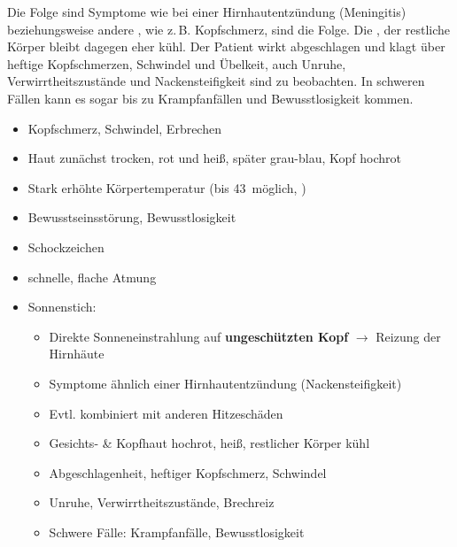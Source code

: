 {Die Folge sind Symptome wie bei
einer Hirnhautentzündung (Meningitis) beziehungsweise andere
, wie z.\,B. Kopfschmerz, sind die
Folge. Die , der 
restliche Körper bleibt dagegen eher kühl. Der Patient
wirkt abgeschlagen und klagt über heftige 
Kopfschmerzen, Schwindel und Übelkeit, auch Unruhe, 
Verwirrtheitszustände und Nackensteifigkeit sind zu
beobachten. In schweren Fällen kann es sogar bis zu 
Krampfanfällen und Bewusstlosigkeit kommen.
}{
\begin{itemize}
  \item Kopfschmerz, Schwindel, Erbrechen
  \item Haut zunächst trocken, rot und heiß, später grau-blau, Kopf
  hochrot
  \item Stark  erhöhte  Körpertemperatur (bis 
  43{\,\DegC} möglich, )
  \item Bewusstseinsstörung, Bewusstlosigkeit
  \item Schockzeichen
  \item schnelle, flache Atmung
  \item Sonnenstich: 
  \begin{itemize}
    \item Direkte Sonneneinstrahlung auf \textbf{ungeschützten
    Kopf} ${\rightarrow}$ Reizung der Hirnhäute
    \item Symptome ähnlich einer
    Hirnhautentzündung (Nackensteifigkeit)
    \item Evtl. kombiniert mit anderen Hitzeschäden
    \item Gesichts- \& Kopfhaut hochrot, heiß, restlicher Körper kühl
    \item Abgeschlagenheit, heftiger Kopfschmerz, Schwindel
    \item Unruhe, Verwirrtheitszustände, Brechreiz
    \item Schwere Fälle: Krampfanfälle, Bewusstlosigkeit
  \end{itemize}
\end{itemize}
}{}{}{}




\clearpage %
\section{}
\label{topic:unterkuehlung}



